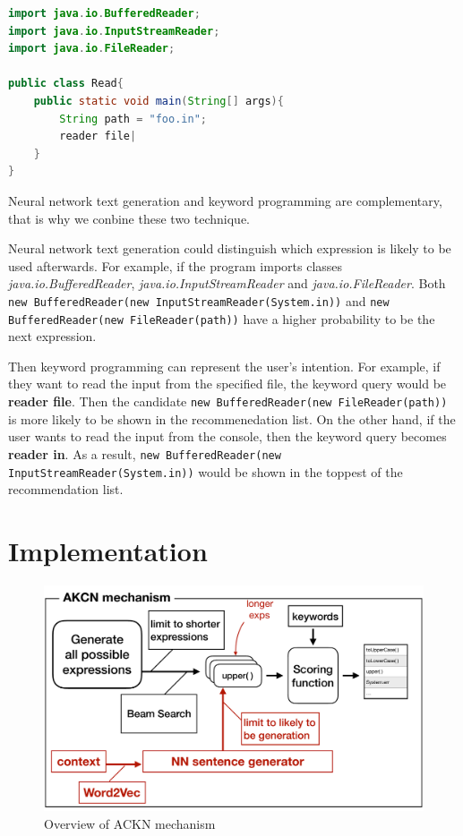 \documentclass[PRO,english]{ipsj}
\begin{document}
\begin{lstlisting}[language=Java]
import java.io.BufferedReader;
import java.io.InputStreamReader;
import java.io.FileReader;

public class Read{
    public static void main(String[] args){
        String path = "foo.in";
        reader file|
    }
}
\end{lstlisting}
 
 Neural network text generation and keyword programming are complementary, that is why we conbine these two technique. 

 Neural network text generation could distinguish which expression is likely to be used afterwards. For example, if the program imports classes \textit{java.io.BufferedReader}, \textit{java.io.InputStreamReader} and \textit{java.io.FileReader}. Both \texttt{new BufferedReader(new InputStreamReader(System.in))} and \texttt{new BufferedReader(new FileReader(path))} have a higher probability to be the next expression.

 Then keyword programming can represent the user's intention. For example, if they want to read the input from the specified file, the keyword query would be \textbf{reader file}. Then the candidate \texttt{new BufferedReader(new FileReader(path))} is more likely to be shown in the recommenedation list. On the other hand, if the user wants to read the input from the console, then the keyword query becomes \textbf{reader in}. As a result, \texttt{new BufferedReader(new InputStreamReader(System.in))} would be shown in the toppest of the recommendation list.

\section{Implementation}\label{sec:implementation}

\begin{figure}[!ht]
\centering
\includegraphics[scale=0.42]{Figure/Overview.pdf}
\caption{Overview of ACKN mechanism}
\label{fig:overview}
\end{figure}
\end{document}
